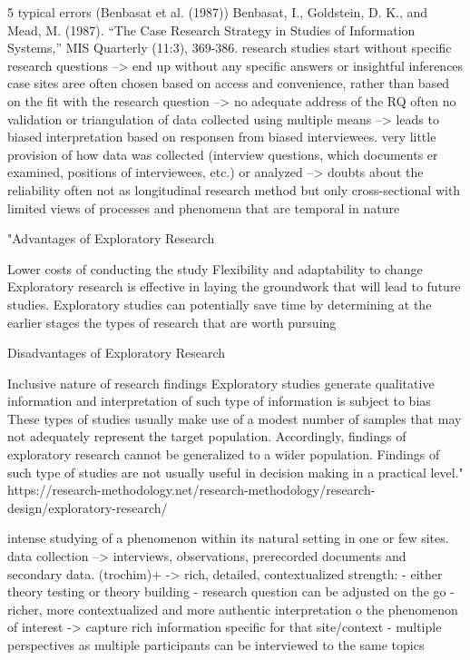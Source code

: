 5 typical errors (Benbasat et al. (1987)) Benbasat, I., Goldstein, D. K., and Mead, M. (1987). “The Case Research Strategy in Studies of Information Systems,” MIS Quarterly (11:3), 369-386.
research studies start without specific research questions --> end up without any specific answers or insightful inferences
case sites aree often chosen based on access and convenience, rather than based on the fit with the research question --> no adequate address of the RQ
often no validation or triangulation of data collected using multiple means --> leads to biased interpretation based on responsen from biased interviewees.
very little provision of how data was collected (interview questions, which documents er examined, positions of interviewees, etc.) or analyzed --> doubts about the reliability
often not as longitudinal research method but only cross-sectional with limited views of processes and phenomena that are temporal in nature


"Advantages of Exploratory Research

    Lower costs of conducting the study
    Flexibility and adaptability to change
    Exploratory research is effective in laying the groundwork that will lead to future studies.
    Exploratory studies can potentially save time by determining at the earlier stages the types of research that are worth pursuing

Disadvantages of Exploratory Research

    Inclusive nature of research findings
    Exploratory studies generate qualitative information and interpretation of such type of information is subject to bias
    These types of studies usually make use of a modest number of samples that may not adequately represent the target population. Accordingly, findings of exploratory research cannot be generalized to a wider population.
    Findings of such type of studies are not usually useful in decision making in a practical level."
    https://research-methodology.net/research-methodology/research-design/exploratory-research/

    
intense studying of a phenomenon within its natural setting in one or few sites. data collection --> interviews, observations, prerecorded documents and secondary data. (trochim)+
-> rich, detailed, contextualized
strength: 
- either theory testing or theory building
- research question can be adjusted on the go
- richer, more contextualized and more authentic interpretation o the phenomenon of interest -> capture rich information specific for that site/context
- multiple perspectives as multiple participants can be interviewed to the same topics

